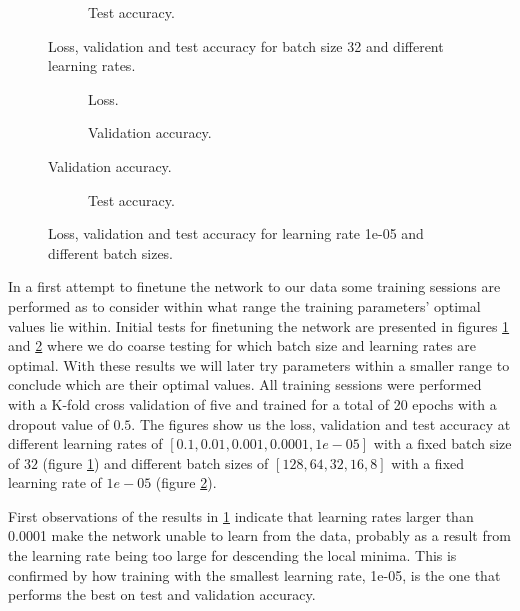 \begin{figure}
	\ContinuedFloat
	\begin{subfigure}[b]{\textwidth}
		
		\caption{Test accuracy.}
	\end{subfigure}
	\caption{Loss, validation and test accuracy for batch size 32 and different learning rates.}
	\label{fig:res_init_lr}
\end{figure}


\begin{figure}
	\begin{subfigure}[b]{\textwidth}
		
		\caption{Loss.}
	\end{subfigure}

	\begin{subfigure}[b]{\textwidth}
		
		\caption{Validation accuracy.}
	\end{subfigure}
\end{figure}

\begin{figure}
	\ContinuedFloat
	\begin{subfigure}[b]{\textwidth}
		
		\caption{Test accuracy.}
	\end{subfigure}
	\caption{Loss, validation and test accuracy for learning rate 1e-05 and different batch sizes.}
	\label{fig:res_init_bs}
\end{figure}


In a first attempt to finetune the network to our data some training sessions are performed as to consider within what range the training parameters' optimal values lie within. Initial tests for finetuning the network are presented in figures \ref{fig:res_init_lr} and \ref{fig:res_init_bs} where we do coarse testing for which batch size and learning rates are optimal. With these results we will later try parameters within a smaller range to conclude which are their optimal values. All training sessions were performed with a K-fold cross validation of five and trained for a total of 20 epochs with a dropout value of \(0.5\). The figures show us the loss, validation and test accuracy at different learning rates of \([0.1, 0.01, 0.001, 0.0001, 1e-05]\) with a fixed batch size of \(32\) (figure \ref{fig:res_init_lr}) and different batch sizes of \([128, 64, 32, 16, 8]\) with a fixed learning rate of \(1e-05\) (figure \ref{fig:res_init_bs}).

First observations of the results in \ref{fig:res_init_lr} indicate that learning rates larger than 0.0001 make the network unable to learn from the data, probably as a result from the learning rate being too large for descending the local minima. This is confirmed by how training with the smallest learning rate, 1e-05, is the one that performs the best on test and validation accuracy.

